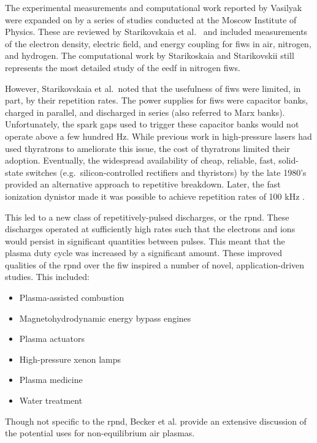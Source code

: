 The experimental measurements and computational work reported by Vasilyak were
expanded on by a series of studies conducted at the Moscow Institute of Physics.
These are reviewed by Starikovskaia et al.~\cite{Starikovskaia2001} and included
measurements of the electron density, electric field, and energy coupling for
\acs{fiw}s in air, nitrogen, and hydrogen. The computational work by
Starikoskaia and Starikovskii \cite{Starikovskaia2001a} still represents the
most detailed study of the \acs{eedf} in nitrogen \acs{fiw}s.

However, Starikovskaia et al.\ noted that the usefulness of \acs{fiw}s were
limited, in part, by their repetition rates. The power supplies for \acs{fiw}s
were capacitor banks, charged in parallel, and discharged in series (also
referred to Marx banks). Unfortunately, the spark gaps used to trigger these
capacitor banks would not operate above a few hundred Hz. While previous work in
high-pressure lasers had used thyratrons to ameliorate this issue, the cost of
thyratrons limited their adoption. Eventually, the widespread availability of
cheap, reliable, fast, solid-state switches (e.g.\ silicon-controlled rectifiers
and thyristors) by the late 1980's provided an alternative approach to
repetitive breakdown. Later, the fast ionization dynistor made it was possible
to achieve repetition rates of 100 kHz \cite{Efanov1997}.

This led to a new class of repetitively-pulsed discharges, or the \acs{rpnd}.
These discharges operated at sufficiently high rates such that the electrons and
ions would persist in significant quantities between pulses. This meant that the
plasma duty cycle was increased by a significant amount. These improved
qualities of the \acs{rpnd} over the \acs{fiw} inspired a number of novel,
application-driven studies. This included:
\begin{itemize}
  \item Plasma-assisted combustion \cite{Pancheshnyi2006, Starikovskaia2006, 
        Adamovich2008}
  \item Magnetohydrodynamic energy bypass engines \cite{Macheret2002,
        Adamovich2008, Schneider2009a}
  \item Plasma actuators \cite{Starikovskii2009, Adamovich2009}
  \item High-pressure xenon lamps \cite{Nikandrov2008}
  \item Plasma medicine \cite{Ayan2009, Zimmermann2012}
  \item Water treatment \cite{Foster2013}
\end{itemize}
Though not specific to the \acs{rpnd}, Becker et al. \cite{Becker2005} provide
an extensive discussion of the potential uses for non-equilibrium air plasmas.

